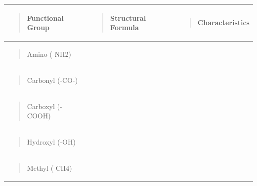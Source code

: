 \documentclass[
  letterpaper,
  DIV=11,
  numbers=noendperiod]{scrreprt}
\newcounter{none} %
\begin{document}
{\def\LTcaptype{none} %
\begin{longtable}[]{@{}
  >{\raggedright\arraybackslash}p{}
  >{\raggedright\arraybackslash}p{}
  >{\raggedright\arraybackslash}p{}@{}}
\toprule\noalign{}
\begin{minipage}[b]{\linewidth}\raggedright
\begin{quote}
\textbf{Functional Group}
\end{quote}
\end{minipage} & \begin{minipage}[b]{\linewidth}\raggedright
\begin{quote}
\textbf{Structural Formula}
\end{quote}
\end{minipage} & \begin{minipage}[b]{\linewidth}\raggedright
\begin{quote}
\textbf{Characteristics}
\end{quote}
\end{minipage} \\
\midrule\noalign{}
\endhead
\bottomrule\noalign{}
\endlastfoot
\begin{minipage}[t]{\linewidth}\raggedright
\begin{quote}
Amino (-NH2)
\end{quote}
\end{minipage} & & \\
\begin{minipage}[t]{\linewidth}\raggedright
\begin{quote}
Carbonyl (-CO-)
\end{quote}
\end{minipage} & & \\
\begin{minipage}[t]{\linewidth}\raggedright
\begin{quote}
Carboxyl (-COOH)
\end{quote}
\end{minipage} & & \\
\begin{minipage}[t]{\linewidth}\raggedright
\begin{quote}
Hydroxyl (-OH)
\end{quote}
\end{minipage} & & \\
\begin{minipage}[t]{\linewidth}\raggedright
\begin{quote}
Methyl (-CH4)
\end{quote}
\end{minipage} & & \\
\end{longtable}
}
\end{document}
